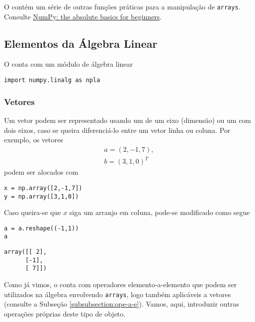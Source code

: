 \documentclass[a4paper,10pt,twoside]{article}
\begin{document}
 
\begin{obs}
O {\numpy} contém um série de outras funções práticas para a manipulação de \texttt{arrays}. Consulte \href{https://numpy.org/doc/stable/user/absolute_beginners.html\#numpy-the-absolute-basics-for-beginners}{NumPy: the absolute basics for beginners}.  
\end{obs}

\subsection{Elementos da Álgebra Linear}

O {\PYTHONnumpy} conta com um módulo de álgebra linear

\begin{lstlisting}
import numpy.linalg as npla
\end{lstlisting}

\subsubsection{Vetores}

Um vetor podem ser representado usando um {\PYTHONnumpyDOTarray} de um eixo (dimensão) ou um com dois eixos, caso se queira diferenciá-lo entre um vetor linha ou coluna. Por exemplo, os vetores
\begin{gather}
  a = (2, -1, 7),\\
  b = (3, 1, 0)^T
\end{gather}
podem ser alocados com

\begin{lstlisting}
x = np.array([2,-1,7])
y = np.array([3,1,0])
\end{lstlisting}

Caso queira-se que $x$ siga um arranjo em coluna, pode-se modificado como segue

\begin{lstlisting}
a = a.reshape((-1,1))
a
\end{lstlisting}

\begin{verbatim}
array([[ 2],
      [-1],
      [ 7]])
\end{verbatim}

Como já vimos, o {\numpy} conta com operadores elemento-a-elemento que podem ser utilizados na álgebra envolvendo \texttt{arrays}, logo também aplicáveis a vetores (consulte a Subseção \ref{subsubsection:ope-a-e}). Vamos, aqui, introduzir outras operações próprias deste tipo de objeto.
\end{document}

